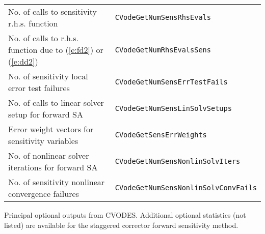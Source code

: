 \begin{acmtable}{\textwidth}
\begin{tabularx}{\textwidth}{ll}
No. of calls to sensitivity r.h.s. function & {\tt CVodeGetNumSensRhsEvals} \\
No. of calls to r.h.s. function due to (\ref{e:fd2}) or (\ref{e:dd2}) & {\tt CVodeGetNumRhsEvalsSens} \\
No. of sensitivity local error test failures & {\tt CVodeGetNumSensErrTestFails} \\
No. of calls to linear solver setup for forward SA & {\tt CVodeGetNumSensLinSolvSetups} \\
Error weight vectors for sensitivity variables & {\tt CVodeGetSensErrWeights} \\
No. of nonlinear solver iterations for forward SA & {\tt CVodeGetNumSensNonlinSolvIters} \\
No. of sensitivity nonlinear convergence failures & {\tt CVodeGetNumSensNonlinSolvConvFails}
\end{tabularx}
\caption{Principal optional outputs from CVODES. 
Additional optional statistics (not listed) are available for the staggered 
corrector forward sensitivity method.}
\label{t:optional_outputs}
\end{acmtable}
